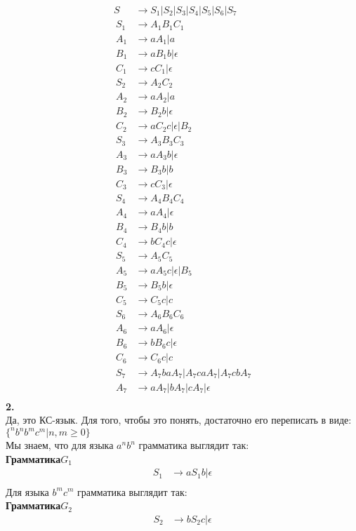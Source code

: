 \documentclass[a4paper,12pt]{article}
\begin{document}
\begin{align*}
	S&\to S_1|S_2|S_3|S_4|S_5|S_6|S_7\\\
	S_1&\to A_1B_1C_1\\\
	A_1&\to aA_1|a\\\
	B_1&\to aB_1b|\epsilon\\\
	C_1&\to cC_1|\epsilon\\\
	S_2&\to A_2C_2\\\
	A_2&\to aA_2|a\\\
	B_2&\to B_2b|\epsilon\\\
	C_2&\to aC_2c|\epsilon|B_2\\\
	S_3&\to A_3B_3C_3\\\
	A_3&\to aA_3b|\epsilon\\\
	B_3&\to B_3b|b\\\
	C_3&\to cC_3|\epsilon\\\
	S_4&\to A_4B_4C_4\\\
	A_4&\to aA_4|\epsilon\\\
	B_4&\to B_4b|b\\\
	C_4&\to bC_4c|\epsilon\\\
	S_5&\to A_5C_5\\\
	A_5&\to aA_5c|\epsilon|B_5\\\
	B_5&\to B_5b|\epsilon\\\
	C_5&\to C_5c|c\\\
	S_6&\to A_6B_6C_6\\\
	A_6&\to aA_6|\epsilon\\\
	B_6&\to bB_6c|\epsilon\\\
	C_6&\to C_6c|c\\\
	S_7&\to A_7baA_7|A_7caA_7|A_7cbA_7\\\
	A_7&\to aA_7|bA_7|cA_7|\epsilon\\\
\end{align*}
\textbf{2.}\\
Да, это КС-язык. Для того, чтобы это понять, достаточно его переписать в виде:\\
$\lbrace ^nb^nb^mc^m|n,m \geq 0\rbrace$\\
Мы знаем, что для языка $a^nb^n$ грамматика выглядит так:\\
\textbf{Грамматика$ G_1$}
\begin{align*}
	S_1&\to aS_1b|\epsilon\\\
\end{align*}
Для языка $b^mc^m$ грамматика выглядит так:\\
\textbf{Грамматика$ G_2$}
\begin{align*}
	S_2&\to bS_2c|\epsilon\\\
\end{align*}
\end{document}

